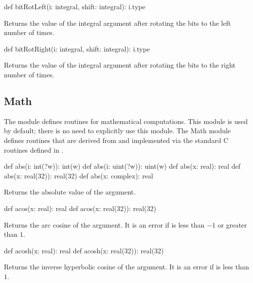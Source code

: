 \begin{protohead}
def bitRotLeft(i: integral, shift: integral): i.type
\end{protohead}
\begin{protobody}
Returns the value of the integral argument  after rotating the
bits to the left  number of times.
\end{protobody}

\begin{protohead}
def bitRotRight(i: integral, shift: integral): i.type
\end{protohead}
\begin{protobody}
Returns the value of the integral argument  after rotating the
bits to the right  number of times.
\end{protobody}

\subsection{Math}
\label{Math}

The module  defines routines for mathematical computations.
This module is used by default; there is no need to explicitly use
this module.  The Math module defines routines that are derived from
and implemented via the standard C routines defined in .

\vspace{1pc}

\begin{protohead}
def abs(i: int(?w)): int(w)
def abs(i: uint(?w)): uint(w)
def abs(x: real): real
def abs(x: real(32)): real(32)
def abs(x: complex): real
\end{protohead}
\begin{protobody}
Returns the absolute value of the argument.
\end{protobody}

\begin{protohead}
def acos(x: real): real
def acos(x: real(32)): real(32)
\end{protohead}
\begin{protobody}
Returns the arc cosine of the argument.  It is an error if  is
less than $-1$ or greater than $1$.
\end{protobody}

\begin{protohead}
def acosh(x: real): real
def acosh(x: real(32)): real(32)
\end{protohead}
\begin{protobody}
Returns the inverse hyperbolic cosine of the argument.  It is an error
if  is less than $1$.
\end{protobody}

